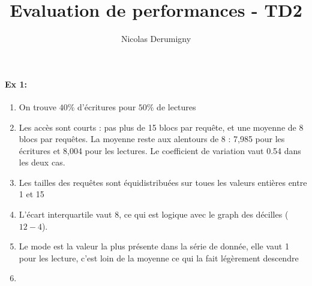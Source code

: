 \documentclass{article}
\title{Evaluation de performances - TD2}
\author{Nicolas Derumigny}
\date{}
\begin{document}
\paragraph{Ex 1:}
\begin{enumerate}
\item On trouve $40\%$ d'écritures pour $50\%$ de lectures

\item Les accès sont courts : pas plus de 15 blocs par requête, et une moyenne de 8 blocs par requêtes. La moyenne reste aux alentours de 8 : 7,985 pour les écritures et 8,004 pour les lectures. Le coefficient de variation vaut 0.54 dans les deux cas.

\item Les tailles des requêtes sont équidistribuées sur toues les valeurs entières entre 1 et 15

\item L'écart interquartile vaut 8, ce qui est logique avec le graph des décilles ($12-4$).

\item Le mode est la valeur la plus présente dans la série de donnée, elle vaut 1 pour les lecture, c'est loin de la moyenne ce qui la fait légèrement descendre

\item 


\end{enumerate}
\end{document}
